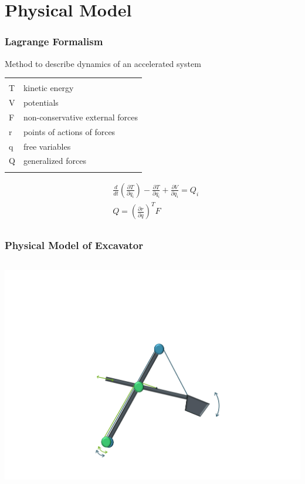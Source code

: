 \section{Physical Model}

\begin{frame}
	\frametitle{Lagrange Formalism}
	Method to describe dynamics of an accelerated system\\
	\begin{small}
	\begin{tabular}{ll}
		 & \\
		T & kinetic energy\\
		V & potentials\\
		F & non-conservative external forces\\
		r & points of actions of forces\\ %
		q & free variables\\
		Q & generalized forces\\ \\
	\end{tabular}
	\end{small}
	
	\begin{align*}
	&\frac{d}{dt}\left(\frac{\partial T}{\partial \dot{q}_i}\right) -
	\frac{\partial T}{\partial q_i} +
	\frac{\partial V}{\partial q_i}
	= Q_i \\
	& Q = \left(\frac{\partial r}{\partial q}\right)^T F\\
	\end{align*}
		
\end{frame}	

\begin{frame}
	\frametitle{Physical Model of Excavator}
	
	
	\begin{columns}
			\centering
			\includegraphics[trim=30cm 5cm 30cm 23cm, clip=true, width=\linewidth]{img/Excavator_Only}
	\end{columns}
	
\end{frame}

